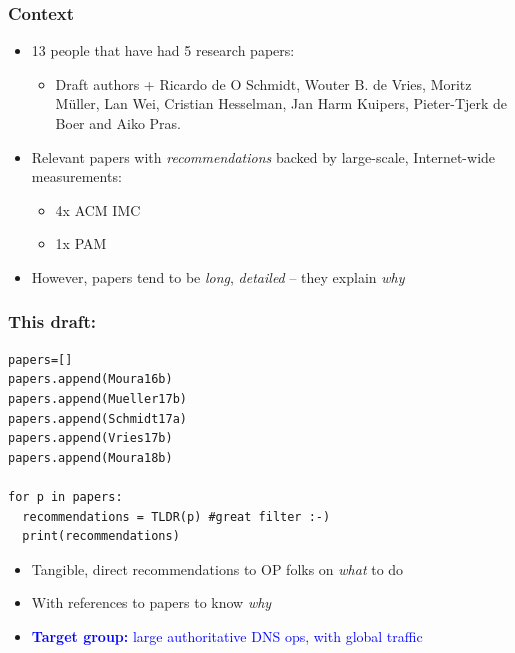 \documentclass[11pt,show 
notes,notheorems,noamsthm,blank]{beamer} %
\begin{document}
\begin{frame}
 \frametitle{Context}
 
 \begin{itemize}

  \item 13 people that have had 5  research papers:
  \begin{itemize}
   \item \footnotesize Draft authors + Ricardo de O Schmidt, Wouter B. de 
Vries, Moritz M\"{u}ller, Lan Wei,  Cristian Hesselman, Jan Harm Kuipers, 
Pieter-Tjerk de Boer and Aiko  Pras.
  \end{itemize}

 \item Relevant papers with \textit{recommendations} backed by 
large-scale, Internet-wide measurements: 
\begin{itemize}
 \item 4x ACM IMC
 \item 1x PAM
\end{itemize}


\item However, papers tend to be \textit{long}, \textit{detailed} -- they 
explain \textit{why} 


 \end{itemize}

\end{frame}



\begin{frame}[fragile]
 \frametitle{\textbf{This draft:}}
 
 

 \lstset{language=Python}
 \lstset{frame=lines}
  \lstset{basicstyle=\footnotesize}
  
  
\begin{lstlisting}
papers=[]
papers.append(Moura16b)
papers.append(Mueller17b)
papers.append(Schmidt17a)
papers.append(Vries17b)
papers.append(Moura18b)

for p in papers:
  recommendations = TLDR(p) #great filter :-)
  print(recommendations)
\end{lstlisting}

\begin{itemize}
 \item Tangible, direct recommendations to OP folks on \textit{what} to do
 \item With references to papers to know \textit{why}
  \item \textcolor{blue}{\textbf{Target group:} large authoritative DNS ops, 
with global traffic}

\end{itemize}


\end{frame}
\end{document}
